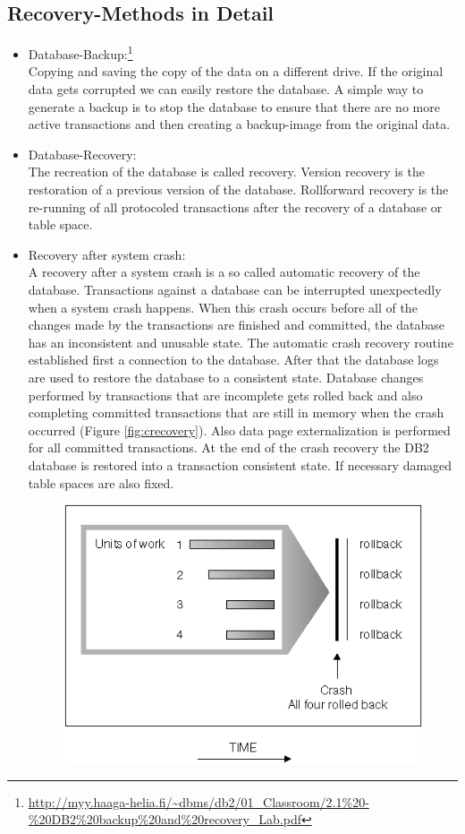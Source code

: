 \documentclass{vldb}
\begin{document}
\subsection{Recovery-Methods in Detail}
\begin{itemize}
\item Database-Backup:\footnote{\url{http://myy.haaga-helia.fi/~dbms/db2/01_Classroom/2.1\%20-\%20DB2\%20backup\%20and\%20recovery_Lab.pdf}}\\
Copying and saving the copy of the data on a different drive. If the original data gets corrupted we can easily restore the database. A simple way to generate a backup is to stop the database to ensure that there are no more active transactions and then creating a backup-image from the original data. 
\item Database-Recovery:\\
The recreation of the database is called recovery. Version recovery is the restoration of a previous version of the database. Rollforward recovery is the re-running of all protocoled transactions after the recovery of a database or table space. 
\item Recovery after system crash:\\
A recovery after a system crash is a so called automatic recovery of the database. Transactions against a database can be interrupted unexpectedly when a system crash happens. When this crash occurs before all of the changes made by the transactions are finished and committed, the database has an inconsistent and unusable state. The automatic crash recovery routine established first a connection to the database. After that the database logs are used to restore the database to a consistent state. Database changes performed by transactions that are incomplete gets rolled back and also completing committed transactions that are still in memory when the crash occurred (Figure \ref{fig:crecovery}). Also data page externalization is performed for all committed transactions. At the end of the crash recovery the DB2 database is restored into a transaction consistent state. If necessary damaged table spaces are also fixed. 
\begin{figure}[H]
	\centering
	\includegraphics[width=.38\textwidth]{crash-recover.png}

\end{figure}
\end{itemize}
\end{document}
